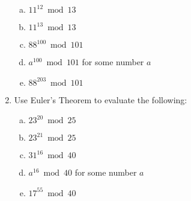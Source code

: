 \documentclass[12pt]{amsart}
\theoremstyle{plain}
\theoremstyle{definition}
\theoremstyle{remark}
\begin{document}
\begin{enumerate}[1.]
		\begin{enumerate}[a.]
			\item $11^{12} \bmod 13$
				\begin{framed}
				\vspace{.3in}
				\end{framed}
			\item $11^{13} \bmod 13$
				\begin{framed}
				\vspace{.3in}
				\end{framed}
			\item $88^{100} \bmod 101$
				\begin{framed}
				\vspace{.3in}
				\end{framed}
			\item $a^{100} \bmod 101$ for some number $a$
				\begin{framed}
				\vspace{.3in}
				\end{framed}
			\item $88^{203} \bmod 101$
				\begin{framed}
				\vspace{.3in}
				\end{framed}
		\end{enumerate}
		\item Use Euler's Theorem to evaluate the following:
		\begin{enumerate}[a.]
			\item $23^{20} \bmod 25$
				\begin{framed}
				\vspace{.3in}
				\end{framed}
			\newpage \item $23^{21} \bmod 25$
				\begin{framed}
				\vspace{.3in}
				\end{framed}
			\item $31^{16} \bmod 40$
				\begin{framed}
				\vspace{.3in}
				\end{framed}
			\item $a^{16} \bmod 40$ for some number $a$
				\begin{framed}
				\vspace{.3in}
				\end{framed}
			\item $17^{55} \bmod 40$
				\begin{framed}

\end{framed}
\end{enumerate}
\end{enumerate}
\end{document}
